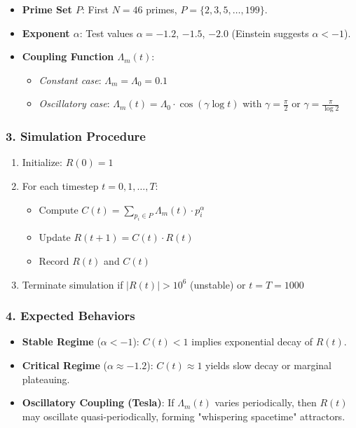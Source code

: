 \documentclass[12pt]{article}
\theoremstyle{plain}
\begin{document}
\begin{itemize}
    \item \textbf{Prime Set $P$}: First $N = 46$ primes, $P = \{2, 3, 5, \dots, 199\}$.
    \item \textbf{Exponent $\alpha$}: Test values $\alpha = -1.2$, $-1.5$, $-2.0$ (Einstein suggests $\alpha < -1$).
    \item \textbf{Coupling Function $\Lambda_m(t)$}:
    \begin{itemize}
        \item \textit{Constant case}: $\Lambda_m = \Lambda_0 = 0.1$
        \item \textit{Oscillatory case}: $\Lambda_m(t) = \Lambda_0 \cdot \cos(\gamma \log t)$ with $\gamma = \frac{\pi}{2}$ or $\gamma = \frac{\pi}{\log 2}$
    \end{itemize}
\end{itemize}

\subsubsection*{3. Simulation Procedure}

\begin{enumerate}
    \item Initialize: $R(0) = 1$
    \item For each timestep $t = 0, 1, \dots, T$:
    \begin{itemize}
        \item Compute $C(t) = \sum_{p_i \in P} \Lambda_m(t) \cdot p_i^\alpha$
        \item Update $R(t+1) = C(t) \cdot R(t)$
        \item Record $R(t)$ and $C(t)$
    \end{itemize}
    \item Terminate simulation if $|R(t)| > 10^6$ (unstable) or $t = T = 1000$
\end{enumerate}

\subsubsection*{4. Expected Behaviors}

\begin{itemize}
    \item \textbf{Stable Regime} ($\alpha < -1$): $C(t) < 1$ implies exponential decay of $R(t)$.
    \item \textbf{Critical Regime} ($\alpha \approx -1.2$): $C(t) \approx 1$ yields slow decay or marginal plateauing.
    \item \textbf{Oscillatory Coupling (Tesla)}: If $\Lambda_m(t)$ varies periodically, then $R(t)$ may oscillate quasi-periodically, forming "whispering spacetime" attractors.
\end{itemize}
\end{document}
